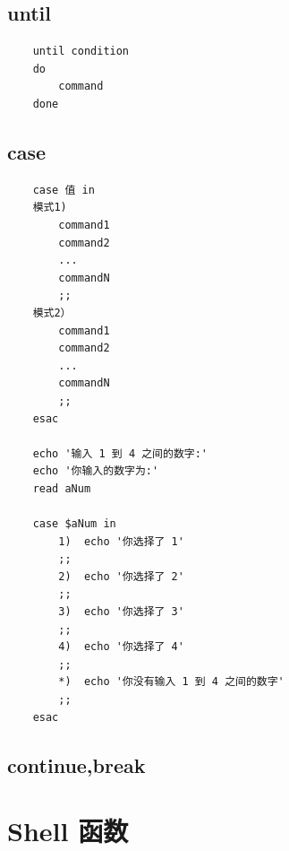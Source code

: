 \documentclass[UTF8,a4paper,12pt]{ctexbook}
\begin{document}
		 \subsection{until}
			 \begin{lstlisting}
	until condition
	do
		command
	done
			 \end{lstlisting}
		\subsection{case}
			\begin{lstlisting}
	case 值 in
	模式1)
		command1
		command2
		...
		commandN
		;;
	模式2）
		command1
		command2
		...
		commandN
		;;
	esac		
	
	echo '输入 1 到 4 之间的数字:'
	echo '你输入的数字为:'
	read aNum
	
	case $aNum in
		1)  echo '你选择了 1'
		;;
		2)  echo '你选择了 2'
		;;
		3)  echo '你选择了 3'
		;;
		4)  echo '你选择了 4'
		;;
		*)  echo '你没有输入 1 到 4 之间的数字'
		;;
	esac
			\end{lstlisting}
		\subsection{continue,break}
	
	 \section{Shell 函数}
\end{document}
